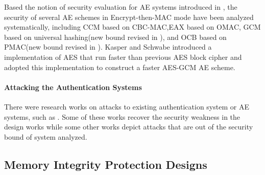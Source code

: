 \documentclass{article}
\begin{document}
Based the notion of security evaluation for AE systems introduced in \cite{aead}, the security of several AE schemes in
Encrypt-then-MAC mode have been analyzed systematically, including CCM \cite{ccm}based on
CBC-MAC,EAX\cite{eax} based on OMAC, GCM
\cite{gcm} based on universal hashing(new bound revised in \cite{breaking}), and
OCB\cite{ocb} based on PMAC(new bound revised in \cite{tweak,iPMAC}). Kasper and
Schwabe introduced a implementation of AES that run faster than previous AES block cipher
and adopted this implementation to construct a faster AES-GCM AE
scheme\cite{fast}.
\paragraph{Attacking the Authentication Systems}
There were research works on attacks to existing authentication system or AE systems, such as
\cite{cycle,attack_blk,hardware_attack}. Some of these works recover the security weakness in the design works while some other works depict attacks that are out of the security bound of system analyzed. 

\subsection{Memory Integrity Protection Designs}
\end{document}
